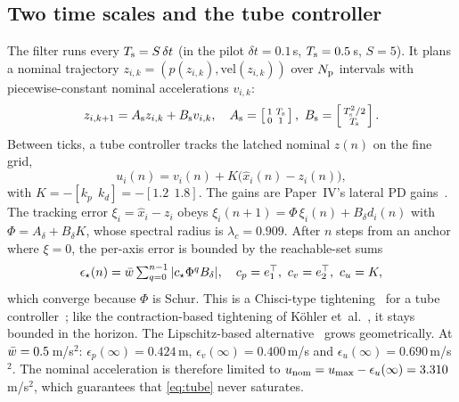 \subsection{Two time scales and the tube controller}
The filter runs every $T_{\mathrm{s}}=S\,\delta t$ (in the pilot $\delta t=0.1$\,s,
$T_{\mathrm{s}}=0.5$\,s, $S=5$). It plans a nominal trajectory $z_{i,k}=(p(z_{i,k}),\mathrm{vel}(z_{i,k}))$
over $N_{\mathrm{p}}$ intervals with piecewise-constant nominal accelerations $v_{i,k}$:
\begin{equation}\label{eq:nominal}
z_{i,k+1}=A_{\mathrm s}z_{i,k}+B_{\mathrm s}v_{i,k},\quad A_{\mathrm s}=\left[\begin{smallmatrix}1&\Ts\\0&1\end{smallmatrix}\right],\ B_{\mathrm s}=\left[\begin{smallmatrix}\Ts^2/2\\\Ts\end{smallmatrix}\right].
\end{equation}
Between ticks, a tube controller tracks the latched nominal $z(n)$ on the
fine grid,
\begin{equation}\label{eq:tube}
u_i(n)=v_i(n)+K\bigl(\hat x_i(n)-z_i(n)\bigr),
\end{equation}
with $K=-[k_p\ \ k_d]=-[1.2\ \ 1.8]$.
The gains are Paper~IV's lateral PD gains~\cite{paperIV}. The tracking error
$\xi_i=\hat x_i-z_i$ obeys $\xi_i(n{+}1)=\Phi\,\xi_i(n)+B_\delta d_i(n)$ with
$\Phi=A_\delta+B_\delta K$, whose spectral radius is $\lambda_c=0.909$. After $n$
steps from an anchor where $\xi=0$, the per-axis error is bounded by the
reachable-set sums
\begin{equation}\label{eq:eps}
\epsilon_\star(n)=\bar w\textstyle\sum_{q=0}^{n-1}|c_\star\Phi^qB_\delta|,\quad c_p=e_1^\top,\ c_v=e_2^\top,\ c_u=K,
\end{equation}
which converge because $\Phi$ is Schur. This is a Chisci-type
tightening~\cite{chisci2001} for a tube controller~\cite{mayne2005tube}; like
the contraction-based tightening of K\"ohler
et~al.~\cite{kohler2021robust}, it stays bounded in the horizon. The
Lipschitz-based alternative~\cite{limon2002iss} grows geometrically. At
$\bar w=0.5$\,m/s$^2$: $\epsilon_p(\infty)=0.424$\,m,
$\epsilon_v(\infty)=0.400$\,m/s and $\epsilon_u(\infty)=0.690$\,m/s$^2$. The
nominal acceleration is therefore limited to
$u_{\mathrm{nom}}=u_{\max}-\epsilon_u(\infty)=3.310$\,m/s$^2$, which guarantees that
\cref{eq:tube} never saturates.

